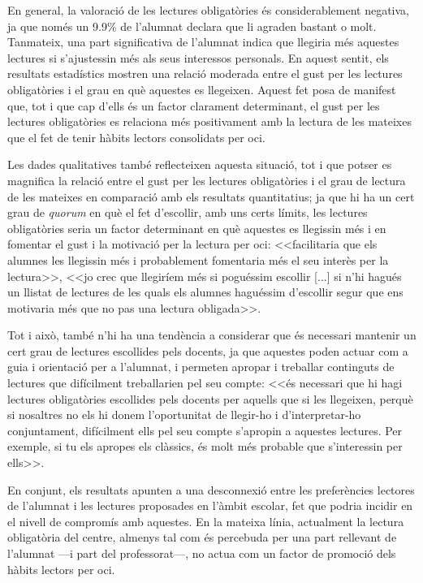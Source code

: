 \documentclass[12pt]{article}
\begin{document}
En general, la valoració de les lectures obligatòries és considerablement negativa, ja que només un 9.9\% de l’alumnat declara que li agraden bastant o molt. Tanmateix, una part significativa de l’alumnat indica que llegiria més aquestes lectures si s’ajustessin més als seus interessos personals. En aquest sentit, els resultats estadístics mostren una relació moderada entre el gust per les lectures obligatòries i el grau en què aquestes es llegeixen. Aquest fet posa de manifest que, tot i que cap d'ells és un factor clarament determinant, el gust per les lectures obligatòries es relaciona més positivament amb la lectura de les mateixes que el fet de tenir hàbits lectors consolidats per oci.

Les dades qualitatives també reflecteixen aquesta situació, tot i que potser es magnifica la relació entre el gust per les lectures obligatòries i el grau de lectura de les mateixes en comparació amb els resultats quantitatius; ja que hi ha un cert grau de \emph{quorum} en què el fet d'escollir, amb uns certs límits, les lectures obligatòries seria un factor determinant en què aquestes es llegissin més i en fomentar el gust i la motivació per la lectura per oci: <<facilitaria que els alumnes les llegissin més i probablement fomentaria més el seu interès per la lectura>>, <<jo crec que llegiríem més si poguéssim escollir [...] si n'hi hagués un llistat de lectures de les quals els alumnes haguéssim d'escollir segur que ens motivaria més que no pas una lectura obligada>>.

Tot i això, també n'hi ha una tendència a considerar que és necessari mantenir un cert grau de lectures escollides pels docents, ja que aquestes poden actuar com a guia i orientació per a l’alumnat, i permeten apropar i treballar continguts de lectures que difícilment treballarien pel seu compte: <<és necessari que hi hagi lectures obligatòries escollides pels docents per aquells que si les llegeixen, perquè si nosaltres no els hi donem l'oportunitat de llegir-ho i d'interpretar-ho conjuntament, difícilment ells pel seu compte s'apropin a aquestes lectures. Per exemple, si tu els apropes els clàssics, és molt més probable que s'interessin per ells>>.

En conjunt, els resultats apunten a una desconnexió entre les preferències lectores de l’alumnat i les lectures proposades en l’àmbit escolar, fet que podria incidir en el nivell de compromís amb aquestes. En la mateixa línia, actualment la lectura obligatòria del centre, almenys tal com és percebuda per una part rellevant de l’alumnat ---i part del professorat---, no actua com un factor de promoció dels hàbits lectors per oci.
\end{document}
